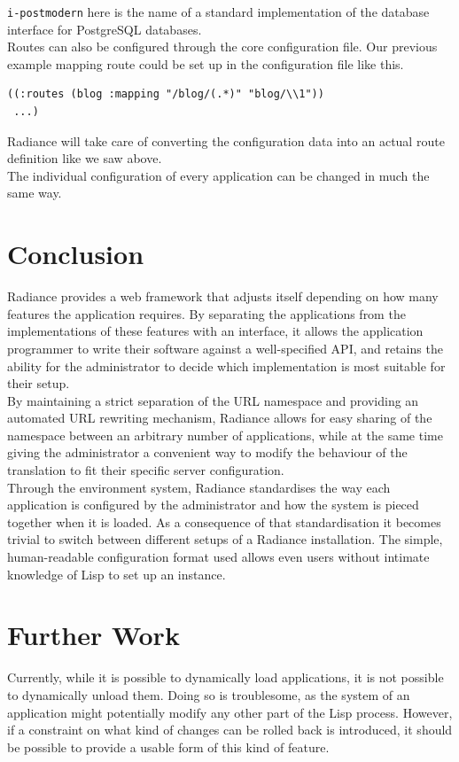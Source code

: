 \documentclass{sig-alternate}
\begin{document}
\texttt{i-postmodern} here is the name of a standard implementation of the database interface for PostgreSQL databases. \\

Routes can also be configured through the core configuration file. Our previous example mapping route could be set up in the configuration file like this.

\begin{verbatim}
((:routes (blog :mapping "/blog/(.*)" "blog/\\1"))
 ...)
\end{verbatim}

Radiance will take care of converting the configuration data into an actual route definition like we saw above. \\

The individual configuration of every application can be changed in much the same way.

\section{Conclusion}
Radiance provides a web framework that adjusts itself depending on how many features the application requires. By separating the applications from the implementations of these features with an interface, it allows the application programmer to write their software against a well-specified API, and retains the ability for the administrator to decide which implementation is most suitable for their setup. \\

By maintaining a strict separation of the URL namespace and providing an automated URL rewriting mechanism, Radiance allows for easy sharing of the namespace between an arbitrary number of applications, while at the same time giving the administrator a convenient way to modify the behaviour of the translation to fit their specific server configuration. \\

Through the environment system, Radiance standardises the way each application is configured by the administrator and how the system is pieced together when it is loaded. As a consequence of that standardisation it becomes trivial to switch between different setups of a Radiance installation. The simple, human-readable configuration format used allows even users without intimate knowledge of Lisp to set up an instance.

\section{Further Work}
Currently, while it is possible to dynamically load applications, it is not possible to dynamically unload them. Doing so is troublesome, as the system of an application might potentially modify any other part of the Lisp process. However, if a constraint on what kind of changes can be rolled back is introduced, it should be possible to provide a usable form of this kind of feature. \\
\end{document}
